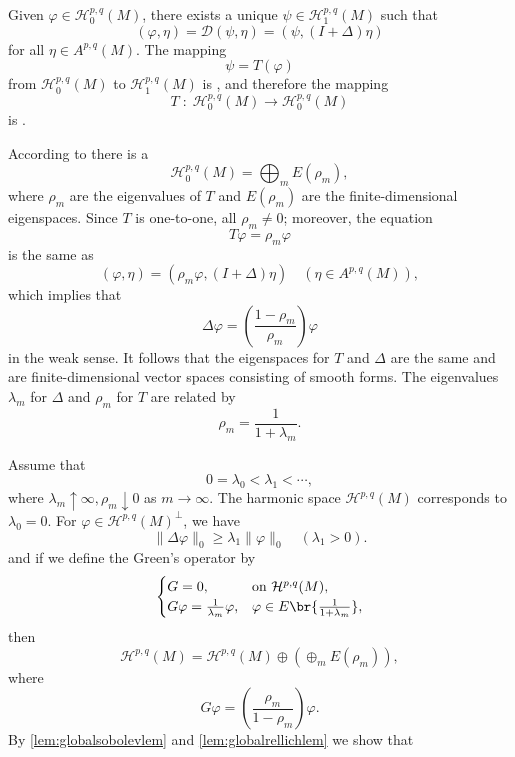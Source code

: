 \documentclass[twoside,openany,12pt]{beautynote}
\begin{document}
\begin{lemma}\label{lem:basic-estimate}
  Given $\varphi \in \mathcal{H}_0^{p, q} (M) $, there exists a unique $\psi
  \in \mathcal{H}_1^{p, q} (M)$ such that
  \[  (\varphi, \eta) =\mathcal{D} (\psi, \eta) = (\psi, (I + \Delta) \eta)
  \]
  for all $\eta \in A^{p, q} (M)$. The mapping
  \[  \psi = T (\varphi) \]
  from $\mathcal{H}_0^{p, q} (M)$ to $\mathcal{H}_1^{p, q} (M)$ is
  {}, and therefore the
  mapping
  \[ T \; : \; \mathcal{H}_0^{p, q} (M) \longrightarrow
     \mathcal{H}_0^{p, q} (M) \]
  is {}.
\end{lemma}



According to {\color{purple}{\bf\itshape the spectral theorem for compact, self-adjoint operators}} there
is a {\color{purple}{\bf\itshape Hilbert-space decomposition}}
\[ \mathcal{H}_0^{p, q} (M) = \bigoplus_m E (\rho_m), \]
where $\rho_m$ are the eigenvalues of $T$ and $E (\rho_m)$ are the
finite-dimensional eigenspaces. Since $T$ is one-to-one,
all $\rho_{m }\neq 0$; moreover, the equation
\[ T \varphi = \rho_m \varphi \]
is the same as
\[  (\varphi, \eta) = (\rho_m \varphi, (I + \Delta) \eta) \quad  (\eta \in
   A^{p, q} (M)), \]
which implies that
\[ \Delta \varphi = \left( \frac{1 - \rho_m}{\rho_m} \right) \varphi \]
in the weak sense. It follows that the eigenspaces for $T$ and $\Delta$ are
the same and are finite-dimensional vector spaces consisting of smooth forms.
The eigenvalues $\lambda_m$ for $\Delta$ and $\rho_m$ for $T$ are related by
\[ \rho_m=\frac{1}{1+\lambda_m}.\]

Assume that 
\[0=\lambda_0<\lambda_1<\cdots,\]
where $\lambda_m\uparrow \infty, \rho_m\downarrow 0$ as $m\to\infty$. The harmonic space $\mathcal{H}^{p,q}(M)$ corresponds to $\lambda_0=0$.
For $\varphi\in \mathcal{H}^{p,q}(M)^{\bot }$, we have
\[\|\Delta\varphi\|_0\geqslant\lambda_1 \|\varphi\|_0\quad (\lambda_1>0).\]
and if we define the Green's operator by 
\[
\begin{cases}
  G=0, & \text{on } \mathcal{H}^{p,q}(M),\\ 
    G\varphi=\frac{1}{\lambda_m}\varphi, &\varphi\in E\br{\frac{1}{1+\lambda_m}},\end{cases}\]
then {\color{purple}}
\[ \mathcal{H}^{p,q}(M)=\mathcal{H}^{p,q}(M)\oplus (\oplus_m E(\rho_m)),\]
where 
\[G\varphi=\left(\frac{\rho_m}{1-\rho_m}\right)\varphi.\]
By \ref{lem:globalsobolevlem} and \ref{lem:globalrellichlem} we show that 



\clearpage
\pagestyle{\auxsettings}
\printbibliography[heading=bibintoc]
\end{document}

